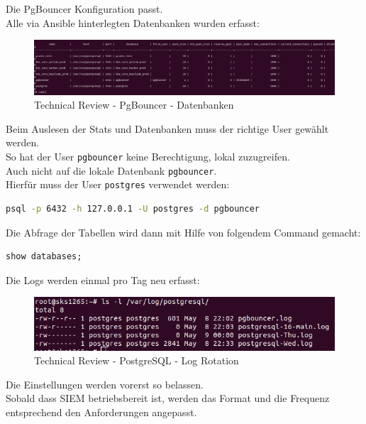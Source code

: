 \begin{flushleft}
    Die PgBouncer Konfiguration passt.\\
    Alle via \Gls{Ansible} hinterlegten Datenbanken wurden erfasst:
    \begin{figure}[H]
        \centering
        \includegraphics[width=1\linewidth]{source/implementation/construction_implementation/technical_review/pgbouncer_databases}
        \caption{Technical Review - PgBouncer - Datenbanken}
        \label{fig:pgbouncer_databases}
    \end{figure}
    Beim Auslesen der Stats und Datenbanken muss der richtige User gewählt werden.\\
    So hat der User \texttt{pgbouncer} keine Berechtigung, lokal zuzugreifen.\\
    Auch nicht auf die lokale Datenbank \texttt{pgbouncer}.\\
    Hierfür muss der User \texttt{postgres} verwendet werden:
\lstset{style=gra_codestyle}
\begin{lstlisting}[language=bash, caption=PgBouncer - Connect,captionpos=b,label={lst:pgbouncer_connect},breaklines=true]
psql -p 6432 -h 127.0.0.1 -U postgres -d pgbouncer
\end{lstlisting}
    Die Abfrage der Tabellen wird dann mit Hilfe von folgendem Command gemacht:
\lstset{style=gra_codestyle}
\begin{lstlisting}[language=sql, caption=PgBouncer - Databases,captionpos=b,label={lst:pgbouncer_list_databases},breaklines=true]
show databases;
\end{lstlisting}
\end{flushleft}
\begin{flushleft}
    Die Logs werden einmal pro Tag neu erfasst:
    \begin{figure}[H]
        \centering
        \includegraphics[width=1\linewidth]{source/implementation/construction_implementation/technical_review/postgresql_log_rotation}
        \caption{Technical Review - PostgreSQL - Log Rotation}
        \label{fig:postgresql_log_rotation}
    \end{figure}
    Die Einstellungen werden vorerst so belassen.\\
    Sobald dass \Gls{SIEM} betriebsbereit ist, werden das Format und die Frequenz entsprechend den Anforderungen angepasst.
\end{flushleft}